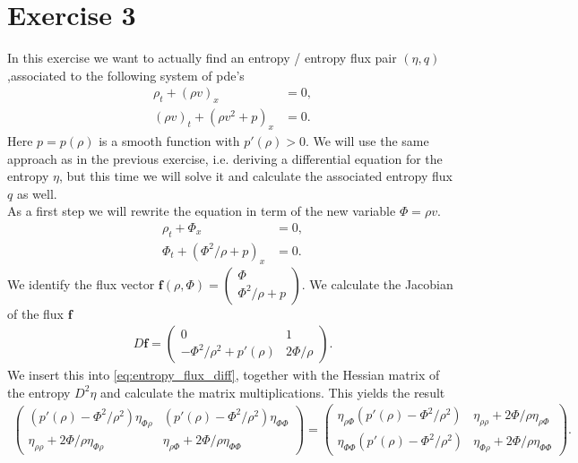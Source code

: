 \section{Exercise 3}
In this exercise we want to actually find an entropy / entropy flux pair $(\eta,q)$,associated to the following system of pde's
\begin{align}
\rho_t +(\rho v)_x &=0,\\
(\rho v)_t +(\rho v^2 +p)_x &=0.
\end{align}
Here $p = p(\rho)$ is a smooth function with $p'(\rho)>0$.  We will use the same approach as in the previous exercise, i.e. deriving a differential equation for the entropy $\eta$, but this time we will solve it and calculate the associated entropy flux $q$ as well. \\
As a first step we will rewrite the equation in term of the new variable $\Phi = \rho v$.
\begin{align}
\rho_t +\Phi_x &=0,\\
\Phi_t +(\Phi^2 / \rho +p)_x &=0.
\end{align}
We identify the flux vector $\bm f(\rho, \Phi) = \begin{pmatrix} \Phi \\ \Phi^2/\rho +p \end{pmatrix} $. 
We calculate the Jacobian of the flux $\bm f$
\begin{align}
D\bm f=\begin{pmatrix}
0 & 1 \\
-\Phi^2/\rho^2 +p'(\rho) & 2\Phi/\rho
\end{pmatrix}.
\end{align}
We insert this into \cref{eq:entropy_flux_diff}, together with the Hessian matrix of the entropy $D^2 \eta$ and calculate the matrix multiplications. This yields the result
\begin{align}
\begin{pmatrix}
(p'(\rho)-\Phi^2/\rho^2)\eta_{\Phi\rho} & (p'(\rho)-\Phi^2/\rho^2) \eta_{\Phi\Phi}\\
\eta_{\rho\rho}+2\Phi/\rho\eta_{\Phi\rho} & \eta_{\rho\Phi} + 2\Phi/\rho \eta_{\Phi\Phi} 
\end{pmatrix}
=
\begin{pmatrix}
\eta_{\rho\Phi}(p'(\rho)-\Phi^2/\rho^2) & \eta_{\rho\rho} +2\Phi/\rho \eta_{\rho \Phi}\\
\eta_{\Phi\Phi}(p'(\rho)-\Phi^2/\rho^2) & \eta_{\Phi\rho}+ 2\Phi/\rho \eta_{\Phi\Phi}
\end{pmatrix}.
\end{align}
